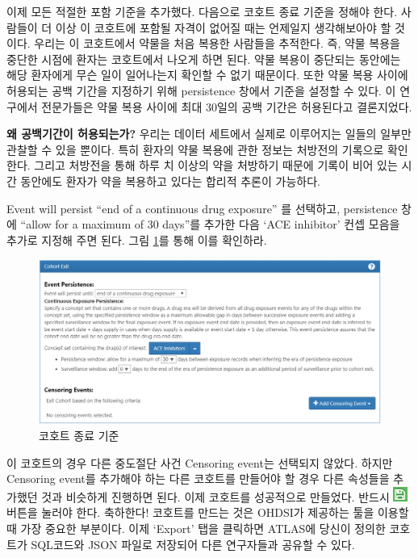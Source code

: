 \documentclass[11pt]{book}
\theoremstyle{definition}
\theoremstyle{definition}
\theoremstyle{definition}
\theoremstyle{remark}
\begin{document}
이제 모든 적절한 포함 기준을 추가했다. 다음으로 코호트 종료 기준을
정해야 한다. 사람들이 더 이상 이 코호트에 포함될 자격이 없어질 때는
언제일지 생각해보아야 할 것이다. 우리는 이 코호트에서 약물을 처음 복용한
사람들을 추적한다. 즉, 약물 복용을 중단한 시점에 환자는 코호트에서
나오게 하면 된다. 약물 복용이 중단되는 동안에는 해당 환자에게 무슨 일이
일어나는지 확인할 수 없기 때문이다. 또한 약물 복용 사이에 허용되는 공백
기간을 지정하기 위해 persistence 창에서 기준을 설정할 수 있다. 이
연구에서 전문가들은 약물 복용 사이에 최대 30일의 공백 기간은 허용된다고
결론지었다.

\textbf{왜 공백기간이 허용되는가?} 우리는 데이터 세트에서 실제로
이루어지는 일들의 일부만 관찰할 수 있을 뿐이다. 특히 환자의 약물 복용에
관한 정보는 처방전의 기록으로 확인한다. 그리고 처방전을 통해 하루 치
이상의 약을 처방하기 때문에 기록이 비어 있는 시간 동안에도 환자가 약을
복용하고 있다는 합리적 추론이 가능하다.

Event will persist ``end of a continuous drug exposure'' 를 선택하고,
persistence 창에 ``allow for a maximum of 30 days''를 추가한 다음 `ACE
inhibitor' 컨셉 모음을 추가로 지정해 주면 된다. 그림
\ref{fig:ATLAScohortexit}를 통해 이를 확인하라.

\begin{figure}

{\centering \includegraphics[width=1\linewidth]{images/Cohorts/cohort-exit} 

}

\caption{코호트 종료 기준}\label{fig:ATLAScohortexit}
\end{figure}

이 코호트의 경우 다른 중도절단 사건 Censoring event는 선택되지 않았다.
하지만 Censoring event를 추가해야 하는 다른 코호트를 만들어야 할 경우
다른 속성들을 추가했던 것과 비슷하게 진행하면 된다. 이제 코호트를
성공적으로 만들었다. 반드시 \includegraphics{images/Cohorts/save.png}
버튼을 눌러야 한다. 축하한다! 코호트를 만드는 것은 OHDSI가 제공하는 툴을
이용할 때 가장 중요한 부분이다. 이제 `Export' 탭을 클릭하면 ATLAS에
당신이 정의한 코호트가 SQL코드와 JSON 파일로 저장되어 다른 연구자들과
공유할 수 있다.
\end{document}
